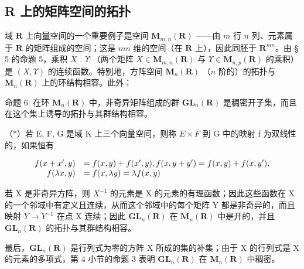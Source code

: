 \subsection{R 上的矩阵空间的拓扑}

域 \(\mathbf{R}\) 上向量空间的一个重要例子是空间 \(\mathbf{M}_{m,n}(\mathbf{R})\) ——由 \(m\) 行 \(n\) 列、元素属于 \(\mathbf{R}\) 的矩阵组成的空间；这是 \(mn\) 维的空间（在 \(\mathbf{R}\) 上），因此同胚于 \(\mathbf{R}^{mn}\)。由 § 5 的命题 5，乘积 \(X\) . \(\Upsilon\) （两个矩阵 \(X \in \mathbf{M}_{m,n}(\mathbf{R})\) 与 \(\Upsilon \in \mathbf{M}_{n,p}(\mathbf{R})\) 的乘积）是 \((X, \Upsilon)\) 的连续函数。特别地，方阵空间 \(\mathbf{M}_n(\mathbf{R})\) （\(n\) 阶的）的拓扑与 \(\mathbf{M}_n(\mathbf{R})\) 上的环结构相容。此外：

命题 6. 在环 \(\mathbf{M}_n(\mathbf{R})\) 中，非奇异矩阵组成的群 \(\mathbf{GL}_n(\mathbf{R})\) 是稠密开子集，而且在这个集上诱导的拓扑与其群结构相容。

（*）若 E, F, G 是域 K 上三个向量空间，则称 \(E \times F\) 到 G 中的映射 f 为双线性的，如果恒有

\[
\begin{array}{r l} f (x + x ^ {\prime}, y) & = f (x, y) + f (x ^ {\prime}, y), f (x, y + y ^ {\prime}) = f (x, y) + f (x, y ^ {\prime}), \\ f (\lambda x, y) & = f (x, \lambda y) = \lambda f (x, y) \end{array}
\]

若 X 是非奇异方阵，则 \(X^{-1}\) 的元素是 X 的元素的有理函数；因此这些函数在 X 的一个邻域中有定义且连续，从而这个邻域中的每个矩阵 Y 都是非奇异的，而且映射 \(Y \to Y^{-1}\) 在点 X 连续；因此 \(\mathbf{GL}_{n}(\mathbf{R})\) 在 \(\mathbf{M}_{n}(\mathbf{R})\) 中是开的，并且 \(\mathbf{GL}_{n}(\mathbf{R})\) 的拓扑与其群结构相容。

最后，\(\mathbf{GL}_{n}(\mathbf{R})\) 是行列式为零的方阵 X 所成的集的补集；由于 X 的行列式是 X 的元素的多项式，第 4 小节的命题 3 表明 \(\mathbf{GL}_{n}(\mathbf{R})\) 在 \(\mathbf{M}_{n}(\mathbf{R})\) 中稠密。

